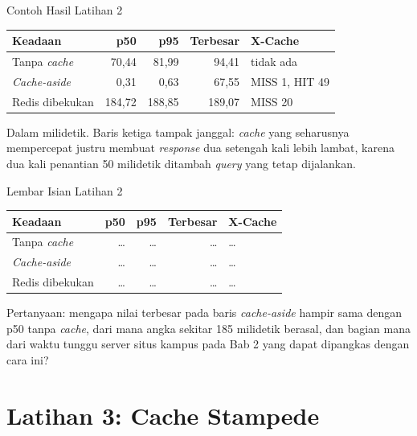 \documentclass[aspectratio=169, table, 12pt]{beamer}
\begin{document}
\begin{frame}{{\Large Contoh Hasil Latihan 2}}
  \vspace{6pt}
  \centering
  {\small
  \begin{tabularx}{\textwidth}{Xrrrl}
    \hline
    \textbf{Keadaan} & \textbf{p50} & \textbf{p95} & \textbf{Terbesar} & \textbf{X-Cache} \\
    \hline
    Tanpa \textit{cache} & 70,44 & 81,99 & 94,41 & tidak ada \\
    \hline
    \textit{Cache-aside} & 0,31 & 0,63 & 67,55 & MISS 1, HIT 49 \\
    \hline
    Redis dibekukan & 184,72 & 188,85 & 189,07 & MISS 20 \\
    \hline
  \end{tabularx}}

  \vspace{8pt}
  {\footnotesize Dalam milidetik. Baris ketiga tampak janggal: \textit{cache}
  yang seharusnya mempercepat justru membuat \textit{response} dua setengah kali lebih
  lambat, karena dua kali penantian 50 milidetik ditambah \textit{query} yang tetap
  dijalankan.}
\end{frame}

\begin{frame}{{\Large Lembar Isian Latihan 2}}
  \vspace{6pt}
  \centering
  {\small
  \begin{tabularx}{\textwidth}{Xrrrl}
    \hline
    \textbf{Keadaan} & \textbf{p50} & \textbf{p95} & \textbf{Terbesar} & \textbf{X-Cache} \\
    \hline
    Tanpa \textit{cache} & \dots & \dots & \dots & \dots \\
    \hline
    \textit{Cache-aside} & \dots & \dots & \dots & \dots \\
    \hline
    Redis dibekukan & \dots & \dots & \dots & \dots \\
    \hline
  \end{tabularx}}

  \vspace{8pt}
  {\footnotesize Pertanyaan: mengapa nilai terbesar pada baris
  \textit{cache-aside} hampir sama dengan p50 tanpa \textit{cache}, dari mana
  angka sekitar 185 milidetik berasal, dan bagian mana dari waktu tunggu
  server situs kampus pada Bab 2 yang dapat dipangkas dengan cara ini?}
\end{frame}

\section{Latihan 3: Cache Stampede}
\end{document}
